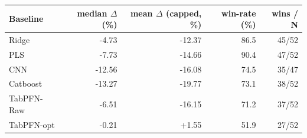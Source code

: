 \begin{tabular}{lrrrr}
\toprule
Baseline & median $\Delta$ (\%) & mean $\Delta$ (capped, \%) & win-rate (\%) & wins / N \\
\midrule
Ridge & -4.73 & -12.37 & 86.5 & 45/52 \\
PLS & -7.73 & -14.66 & 90.4 & 47/52 \\
CNN & -12.56 & -16.08 & 74.5 & 35/47 \\
Catboost & -13.27 & -19.77 & 73.1 & 38/52 \\
TabPFN-Raw & -6.51 & -16.15 & 71.2 & 37/52 \\
TabPFN-opt & -0.21 & +1.55 & 51.9 & 27/52 \\
\bottomrule
\end{tabular}


